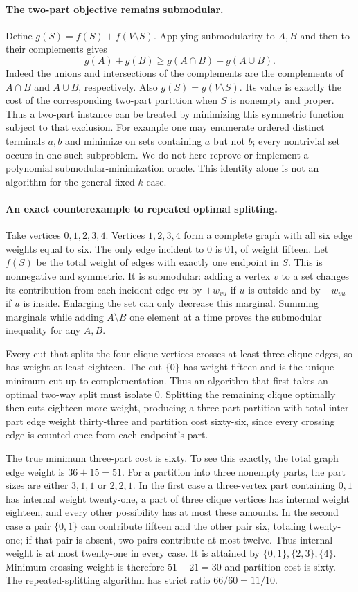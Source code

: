 \documentclass[11pt]{article}
\begin{document}
\paragraph{The two-part objective remains submodular.}
Define $g(S)=f(S)+f(V\setminus S)$. Applying submodularity
to $A,B$ and then to their complements gives
\[
g(A)+g(B)\ge g(A\cap B)+g(A\cup B).
\]
Indeed the unions and intersections of the complements are the
complements of $A\cap B$ and $A\cup B$, respectively.
Also $g(S)=g(V\setminus S)$. Its value is exactly the cost
of the corresponding two-part partition when $S$ is nonempty and
proper. Thus a two-part instance can be treated by minimizing this
symmetric function subject to that exclusion. For example one may
enumerate ordered distinct terminals $a,b$ and minimize on sets
containing $a$ but not $b$; every nontrivial set occurs in one
such subproblem. We do not here reprove or implement a polynomial
submodular-minimization oracle. This identity alone is not an
algorithm for the general fixed-$k$ case.

\paragraph{An exact counterexample to repeated optimal splitting.}
Take vertices $0,1,2,3,4$. Vertices $1,2,3,4$ form a complete
graph with all six edge weights equal to six. The only edge incident
to $0$ is $01$, of weight fifteen. Let $f(S)$ be the total
weight of edges with exactly one endpoint in $S$.
This is nonnegative and symmetric. It is submodular: adding a vertex
$v$ to a set changes its contribution from each incident edge
$vu$ by $+w_{vu}$ if $u$ is outside and by $-w_{vu}$ if
$u$ is inside. Enlarging the set can only decrease this marginal.
Summing marginals while adding $A\setminus B$ one element at
a time proves the submodular inequality for any $A,B$.

Every cut that splits the four clique vertices crosses at least
three clique edges, so has weight at least eighteen. The cut
$\{0\}$ has weight fifteen and is the unique minimum cut up
to complementation. Thus an algorithm that first takes an optimal
two-way split must isolate $0$. Splitting the remaining clique
optimally then cuts eighteen more weight, producing a three-part
partition with total inter-part edge weight thirty-three and
partition cost sixty-six, since every crossing edge is counted
once from each endpoint's part.

The true minimum three-part cost is sixty. To see this exactly,
the total graph edge weight is $36+15=51$. For a partition into
three nonempty parts, the part sizes are either $3,1,1$ or
$2,2,1$. In the first case a three-vertex part containing $0,1$
has internal weight twenty-one, a part of three clique vertices
has internal weight eighteen, and every other possibility has at
most these amounts. In the second case a pair $\{0,1\}$
can contribute fifteen and the other pair six, totaling twenty-one;
if that pair is absent, two pairs contribute at most twelve.
Thus internal weight is at most twenty-one in every case. It is
attained by $\{0,1\},\{2,3\},\{4\}$. Minimum crossing
weight is therefore $51-21=30$ and partition cost is sixty.
The repeated-splitting algorithm has strict ratio $66/60=11/10$.
\end{document}
